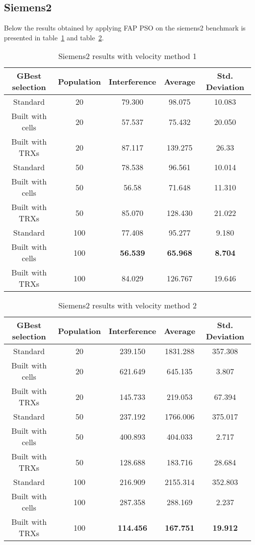\subsection{Siemens2}
Below the results obtained by applying FAP PSO on the siemens2 benchmark is presented in table~\ref{tab:siem2m1} and table~\ref{tab:siem2m2}.
\begin{table}[H]
\centering
	\begin{tabular}{| c | c | c | c | c |}
	\hline
	GBest selection & Population & Interference & Average & Std. Deviation\\ \hline
	Standard & 20 & 79.300 & 98.075 & 10.083\\ \hline
	Built with cells & 20 & 57.537 & 75.432 & 20.050\\ \hline
	Built with TRXs & 20 & 87.117 & 139.275 & 26.33\\ \hline
	Standard & 50 & 78.538 & 96.561 & 10.014\\ \hline
	Built with cells & 50 & 56.58 & 71.648 & 11.310\\ \hline
	Built with TRXs & 50 & 85.070 & 128.430 & 21.022\\ \hline
	Standard & 100 & 77.408 & 95.277 & 9.180\\ \hline
	Built with cells & 100 & \textbf{56.539} & \textbf{65.968} & \textbf{8.704}\\ \hline
	Built with TRXs & 100 & 84.029 & 126.767 & 19.646\\ \hline
	\end{tabular}
\caption{Siemens2 results with velocity method 1}
\label{tab:siem2m1}
\end{table}
\begin{table}[H]
\centering
	\begin{tabular}{| c | c | c | c | c |}
	\hline
	GBest selection & Population & Interference & Average & Std. Deviation\\ \hline
	Standard & 20 & 239.150 & 1831.288 & 357.308\\ \hline
	Built with cells & 20 & 621.649 & 645.135 & 3.807\\ \hline
	Built with TRXs & 20 & 145.733 & 219.053 & 67.394\\ \hline
	Standard & 50 & 237.192 & 1766.006 & 375.017\\ \hline
	Built with cells & 50 & 400.893 & 404.033 & 2.717\\ \hline
	Built with TRXs & 50 & 128.688 & 183.716 & 28.684\\ \hline
	Standard & 100 & 216.909 & 2155.314 & 352.803\\ \hline
	Built with cells & 100 & 287.358 & 288.169 & 2.237\\ \hline
	Built with TRXs & 100 & \textbf{114.456} & \textbf{167.751} & \textbf{19.912}\\ \hline
	\end{tabular}
\caption{Siemens2 results with velocity method 2}
\label{tab:siem2m2}
\end{table}
